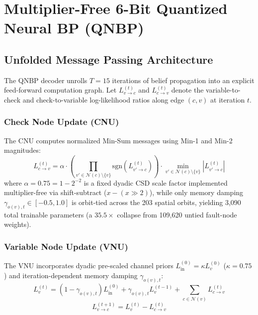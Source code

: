 \documentclass[journal]{IEEEtran}
\begin{document}
\section{Multiplier-Free 6-Bit Quantized Neural BP (QNBP)}

\subsection{Unfolded Message Passing Architecture}
The QNBP decoder unrolls $T=15$ iterations of belief propagation into an explicit feed-forward computation graph. Let $L_{v \to c}^{(t)}$ and $L_{c \to v}^{(t)}$ denote the variable-to-check and check-to-variable log-likelihood ratios along edge $(c, v)$ at iteration $t$.

\subsubsection{Check Node Update (CNU)}
The CNU computes normalized Min-Sum messages using Min-1 and Min-2 magnitudes:
\begin{equation}
    L_{c \to v}^{(t)} = \alpha \cdot \left( \prod_{v' \in \mathcal{N}(c) \setminus \{v\}} \text{sgn}(L_{v' \to c}^{(t)}) \right) \cdot \min_{v' \in \mathcal{N}(c) \setminus \{v\}} |L_{v' \to c}^{(t)}|
\end{equation}
where $\alpha = 0.75 = 1 - 2^{-2}$ is a fixed dyadic CSD scale factor implemented multiplier-free via shift-subtract ($x - (x \gg 2)$), while only memory damping $\gamma_{o(v), t} \in [-0.5, 1.0]$ is orbit-tied across the 203 spatial orbits, yielding 3,090 total trainable parameters (a $35.5\times$ collapse from 109,620 untied fault-node weights).

\subsubsection{Variable Node Update (VNU)}
The VNU incorporates dyadic pre-scaled channel priors $L_{\text{in}}^{(0)} = \kappa L_v^{(0)}$ ($\kappa = 0.75$) and iteration-dependent memory damping $\gamma_{o(v), t}$:
\begin{equation}
    L_v^{(t)} = (1 - \gamma_{o(v), t}) L_{\text{in}}^{(0)} + \gamma_{o(v), t} L_v^{(t-1)} + \sum_{c \in \mathcal{N}(v)} L_{c \to v}^{(t)}
\end{equation}
\begin{equation}
    L_{v \to c}^{(t+1)} = L_v^{(t)} - L_{c \to v}^{(t)}
\end{equation}
\end{document}
